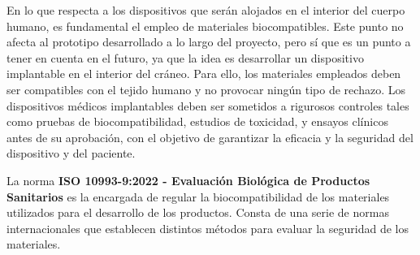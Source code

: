 En lo que respecta a los dispositivos que serán alojados en el interior del cuerpo humano, es fundamental el empleo de materiales biocompatibles. Este punto no afecta al prototipo desarrollado a lo largo del proyecto, pero sí que es un punto a tener en cuenta en el futuro, ya que la idea es desarrollar un dispositivo implantable en el interior del cráneo. Para ello, los materiales empleados deben ser compatibles con el tejido humano y no provocar ningún tipo de rechazo. Los dispositivos médicos implantables deben ser sometidos a rigurosos controles tales como pruebas de biocompatibilidad, estudios de toxicidad, y ensayos clínicos antes de su aprobación, con el objetivo de garantizar la eficacia y la seguridad del dispositivo y del paciente. 

La norma \textbf{ISO 10993-9:2022 - Evaluación Biológica de Productos Sanitarios} \cite{norma} es la encargada de regular la biocompatibilidad de los materiales utilizados para el desarrollo de los productos. Consta de una serie de normas internacionales que establecen distintos métodos para evaluar la seguridad de los materiales.


